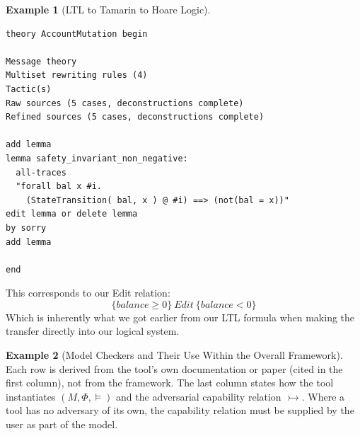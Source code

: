 \documentclass[11pt]{amsart}
\theoremstyle{definition}
\newtheorem{example}{Example}
\theoremstyle{remark}
\newcommand{\adv}{\rightarrowtail}   %
\newcommand{\Edit}{\mathit{Edit}}
\begin{document}
\begin{example}[LTL to Tamarin to Hoare Logic]
\begin{lstlisting}[style=tamarin]
theory AccountMutation begin

Message theory
Multiset rewriting rules (4)
Tactic(s)
Raw sources (5 cases, deconstructions complete)
Refined sources (5 cases, deconstructions complete)

add lemma
lemma safety_invariant_non_negative:
  all-traces
  "forall bal x #i.
    (StateTransition( bal, x ) @ #i) ==> (not(bal = x))"
edit lemma or delete lemma
by sorry
add lemma

end
\end{lstlisting}

This corresponds to our Edit relation:
\[
  \{\mathit{balance} \geq 0\}\ \Edit\ \{\mathit{balance} < 0\}
\]
Which is inherently what we got earlier from our LTL formula when making the transfer directly into our
logical system.
\end{example}

\begin{example}[Model Checkers and Their Use Within the Overall Framework]
\label{ex:checkers}
Each row is derived from the tool's own documentation or paper (cited in the first column), not from
the framework. The last column states how the tool instantiates $(M, \Phi, \models)$ and the adversarial
capability relation $\adv$. Where a tool has no adversary of its own, the capability relation must be supplied
by the user as part of the model.
\end{example}
\end{document}

